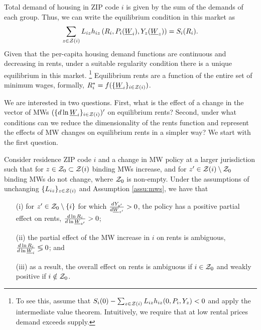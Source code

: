 Total demand of housing in ZIP code $i$ is given by the sum of the demands of 
each group.
Thus, we can write the equilibrium condition in this market as
\begin{equation}\label{eq:equilibrium}
	\sum_{z\in\mathcal{Z}(i)} L_{iz} h_{iz} \left(R_i, P_i(\underline{W}_i), Y_z(\underline{W}_z)\right) = S_i(R_i) .
\end{equation}
Given that the per-capita housing demand functions are continuous and 
decreasing in rents,
under a suitable regularity condition there is a unique equilibrium in this 
market.%
\footnote{To see this, assume that 
$S_i(0) - \sum_{z\in\mathcal{Z}(i)} L_{iz} h_{iz} (0, P_i, Y_z) < 0$
and apply the intermediate value theorem.
Intuitively, we require that at low rental prices demand exceeds supply.}
Equilibrium rents are a function of the entire set of minimum wages, formally, 
$R^*_i = f(\{\underline{W}_i\}_{i\in\mathcal{Z}(i)})$.

We are interested in two questions.
First, what is the effect of a change in the vector of MWs 
$(\{d \ln \underline{W}_i\}_{i\in\mathcal{Z}(i)})'$ on equilibrium rents?
Second, under what conditions can we reduce the dimensionality of the rents 
function and represent the effects of MW changes on equilibrium rents in a 
simpler way?
We start with the first question.

\begin{prop}\label{prop:comparative_statics}
    Consider residence ZIP code $i$ and a change in MW policy at a larger
    jurisdiction such that for $z\in\mathcal{Z}_0 \subset \mathcal{Z}(i)$ binding MWs increase, 
    and for $z'\in\mathcal{Z}(i)\setminus \mathcal{Z}_0$ binding MWs do not change,
    where $\mathcal{Z}_0$ is non-empty.
    Under the assumptions of unchanging $\{L_{iz}\}_{z\in\mathcal{Z}(i)}$ 
    and Assumption \ref{assu:mws},
    we have that
    \begin{enumerate}
        \item[(i)]
        for $z'\in\mathcal{Z}_0\setminus\{i\}$ for which $\frac{d Y_{z'}}{d \underline{W}_{z'}}>0$, 
        the policy has a positive partial effect on rents, 
        $\frac{d\ln R_i}{d\ln\underline{W}_{z'}} > 0$;
        \item[(ii)]
        the partial effect of the MW increase in $i$ on rents is ambiguous, 
        $\frac{d\ln R_i}{d\ln\underline{W}_i} \lessgtr 0$; and
        \item[(iii)]
        as a result, the overall effect on rents is ambiguous if $i\in\mathcal{Z}_0$ 
        and weakly positive if $i\notin\mathcal{Z}_0$.
    \end{enumerate}
\end{prop}

